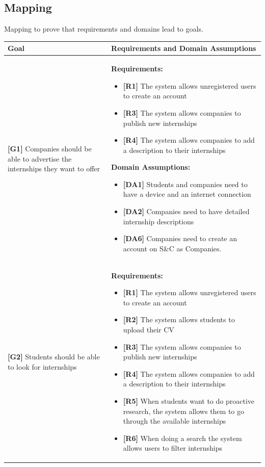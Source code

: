 \pagebreak
\subsection{Mapping}
Mapping to prove that requirements and domains lead to goals.

\begin{longtable}{|p{}|p{}|}
\hline
\textbf{Goal} & \textbf{Requirements and Domain Assumptions} \\
\hline
\textbf{[G1]} Companies should be able to advertise the internships they want to offer 
& 
\textbf{Requirements:}
\begin{itemize}
     \item \textbf{[R1]} The system allows unregistered users to create an account
    \item \textbf{[R3]} The system allows companies to publish new internships
    \item \textbf{[R4]} The system allows companies to add a description to their internships
\end{itemize}
\textbf{Domain Assumptions:}
\begin{itemize}
    \item \textbf{[DA1]} Students and companies need to have a device and an internet connection
    \item \textbf{[DA2]} Companies need to have detailed internship descriptions
    \item \textbf{[DA6]} Companies need to create an account on S\&C as Companies.
\end{itemize} \\
\hline
\textbf{[G2]} Students should be able to look for internships 
& 
\textbf{Requirements:}
\begin{itemize}
     \item \textbf{[R1]} The system allows unregistered users to create an account
    \item \textbf{[R2]} The system allows students to upload their CV
    \item \textbf{[R3]} The system allows companies to publish new internships
    \item \textbf{[R4]} The system allows companies to add a description to their internships
    \item \textbf{[R5]} When students want to do proactive research, the system allows them to go through the available internships
    \item \textbf{[R6]} When doing a search the system allows users to filter internships

\end{itemize}
\end{longtable}
